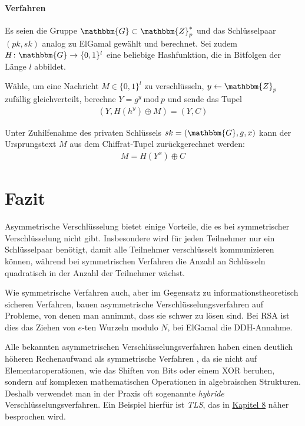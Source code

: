 \paragraph*{Verfahren} Es seien die Gruppe $\mathbbm{G} \subset
\mathbbm{Z}^*_p$ und das Schlüsselpaar $(pk,sk)$ analog zu ElGamal
gewählt und berechnet. Sei zudem $H \colon \mathbbm{G} \rightarrow
\{0,1\}^l$ eine beliebige Hashfunktion, die in Bitfolgen der Länge $l$
abbildet.

Wähle, um eine Nachricht $M \in \{0,1\}^l$ zu verschlüsseln, $y
\leftarrow \mathbbm{Z}_p$ zufällig gleichverteilt, berechne $Y = g^y\
\text{mod}\ p$ und sende das Tupel
\begin{align*} (Y, H(h^y) \oplus M) = (Y, C)
\end{align*}

Unter Zuhilfenahme des privaten Schlüssels $sk = (\mathbbm{G}, g, x)$
kann der Ursprungstext $M$ aus dem Chiffrat-Tupel zurückgerechnet
werden:
\begin{align*} M = H(Y^x) \oplus C
\end{align*}

\section{Fazit} Asymmetrische Verschlüsselung\indexEncryptionAsymm
bietet einige Vorteile, die es bei symmetrischer Verschlüsselung nicht
gibt. Insbesondere wird für jeden Teilnehmer nur ein Schlüsselpaar
benötigt, damit alle Teilnehmer verschlüsselt kommunizieren können,
während bei symmetrischen Verfahren die Anzahl an Schlüsseln quadratisch
in der Anzahl der Teilnehmer wächst.

Wie symmetrische Verfahren auch, aber im Gegensatz zu
informationstheoretisch sicheren Verfahren, bauen asymmetrische
Verschlüsselungsverfahren auf Probleme, von denen man annimmt, dass sie
schwer zu lösen sind. Bei RSA ist dies das Ziehen von $e$-ten Wurzeln
modulo $N$, bei ElGamal die DDH-Annahme.

Alle bekannten asymmetrischen Verschlüsselungsverfahren haben einen
deutlich höheren Rechenaufwand als symmetrische Verfahren
\indexEncryptionSymm, da sie nicht auf Elementaroperationen, wie das
Shiften von Bits oder einem XOR beruhen, sondern auf komplexen
mathematischen Operationen in algebraischen Strukturen. Deshalb
verwendet man in der Praxis oft sogenannte \emph{hybride}
Verschlüsselungsverfahren\indexEncryptionHybrid. Ein Beispiel hierfür
ist \emph{TLS}\indexTLS, das in \hyperref[cha:keyexchange]{Kapitel 8}
näher besprochen wird.